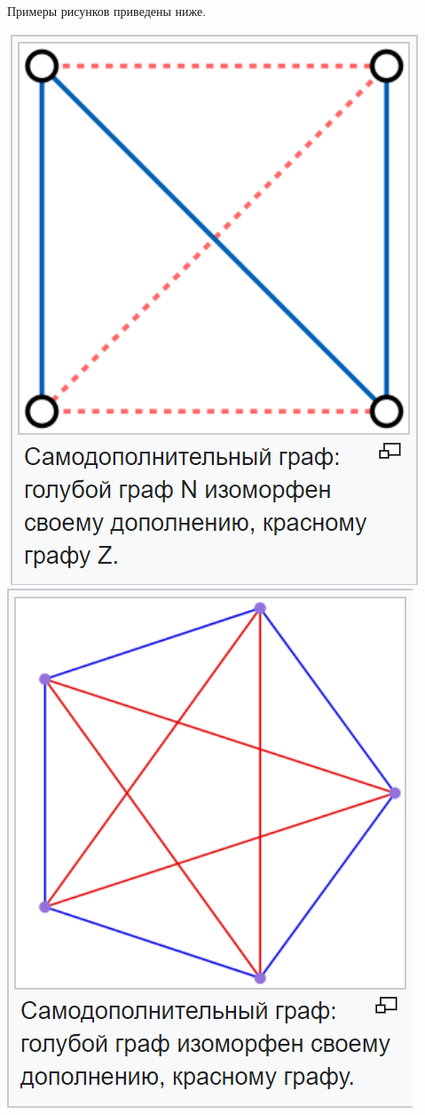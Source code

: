 \documentclass[a4paper,12pt]{article} %
\begin{document}
Примеры рисунков приведены ниже.

\includegraphics[width=\textwidth]{5 1}
\includegraphics[width=\textwidth]{5 2}



\begin{flushright}
\begin{large}
\textbf {}
\end{large}
\end{flushright}


 
\end{document}
